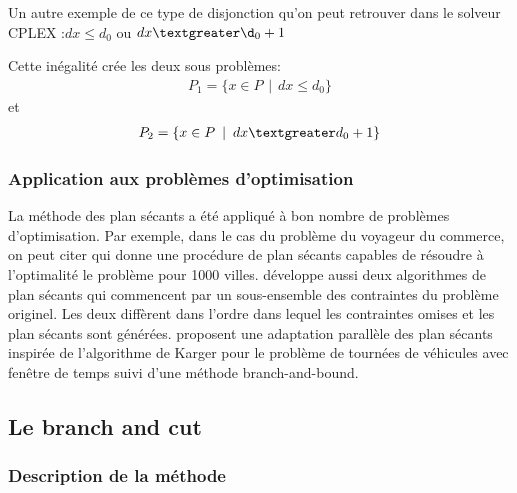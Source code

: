 \documentclass[12pt,a4paper,oneside]{book}
\theoremstyle{definition}
\begin{document}
	    Un autre exemple de ce type de disjonction qu'on peut retrouver dans le solveur CPLEX \cite{manual1987ibm}:$dx \leq d_0$ ou $dx \textgreater \d_0 +1$
	    
		Cette inégalité crée les deux sous problèmes:
		\begin{gather}
		    P_1 = \{ x \in P \hspace{5pt} | \hspace{5pt} dx \leq d_0 \}
		\end{gather}
		et
		\begin{gather}
		    P_2 = \{ x \in P \hspace{5pt} | \hspace{5pt} dx \textgreater d_0 +1  \}    
		\end{gather}
		
		\subsubsection{Application aux problèmes d'optimisation}
		
		La méthode des plan sécants a été appliqué à bon nombre de problèmes d'optimisation. Par exemple, dans le cas du problème du voyageur du commerce, on peut citer \cite{grotschel1991solution} qui donne une procédure de plan sécants capables de résoudre à l'optimalité le problème pour 1000 villes. \cite{miliotis1978using} développe aussi deux algorithmes de plan sécants qui commencent par un sous-ensemble des contraintes du problème originel. Les deux diffèrent dans l'ordre dans lequel les contraintes omises et les plan sécants sont générées.
		\cite{cook1999parallel} proposent une adaptation parallèle des plan sécants inspirée de l'algorithme de Karger pour le problème de tournées de véhicules avec fenêtre de temps suivi d'une méthode branch-and-bound.
		
		
		
	\subsection{Le branch and cut}
	
		\subsubsection{Description de la méthode}
		
\end{document}
